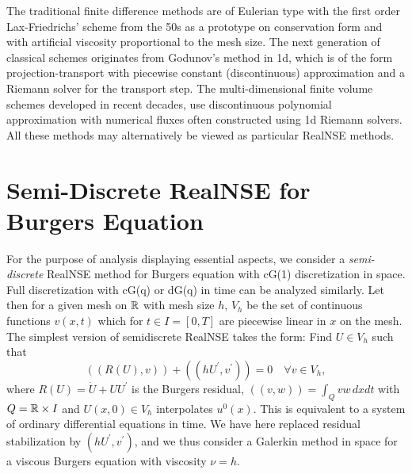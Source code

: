 The traditional finite difference methods are of Eulerian type with the 
first order Lax-Friedrichs' scheme from the 50s as a prototype on 
conservation form  
and with artificial viscosity proportional to the mesh size. The next 
generation
of classical schemes originates from Godunov's method in 1d, 
which is of the form projection-transport with piecewise constant 
(discontinuous) approximation  and a Riemann solver for the transport step. 
The multi-dimensional finite volume schemes 
developed in recent decades, use discontinuous polynomial
approximation with numerical fluxes often constructed using
1d Riemann solvers. 
All these methods may alternatively be viewed as particular 
RealNSE methods. 


 
\section{Semi-Discrete RealNSE for Burgers Equation}

For the purpose of analysis displaying essential aspects,
we consider a \emph{semi-discrete} RealNSE method for Burgers equation with
cG(1) discretization in space. Full discretization
with cG(q) or dG(q) in time can be analyzed similarly.
Let then for a
given mesh on ${\mathbb{R}}$ with 
mesh size $h$, $V_h$ be the set of continuous functions $v(x,t)$ 
which for $t\in I=[0,T]$ are piecewise linear in $x$ on the mesh.
The simplest version of semidiscrete RealNSE takes the form: 
Find $U\in V_h$ such that
\begin{equation}\label{RealNSEburgers} 
  ((R(U),v))+((hU^\prime ,v^\prime ))=0\quad\forall v\in V_h,
\end{equation}
where $R(U)=\dot U+UU^\prime$ is the Burgers residual, $((v,w))=\int_Q vw\, dxdt$ with $Q={\mathbb{R}}\times I$ and $U(x,0)\in V_h$ 
interpolates $u^0(x)$. 
This is equivalent to a  system of ordinary differential equations
in time. We have here replaced residual stabilization by
$(hU^\prime ,v^\prime )$, and we thus consider 
a Galerkin method in space for a viscous Burgers equation
with viscosity $\nu =h$.    

